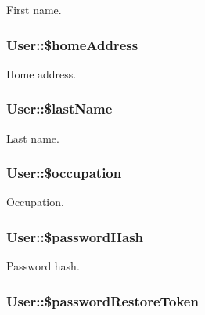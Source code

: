 \label{classUser_ab4216ecb16d420f69cb32659a6744846}
First name. \hypertarget{classUser_a1588ee38de5c013009e557c4806178cf}{
\subsubsection[{\$homeAddress}]{\setlength{\rightskip}{0pt plus 5cm}User::\$homeAddress}}
\label{classUser_a1588ee38de5c013009e557c4806178cf}
Home address. \hypertarget{classUser_a4f49336b16dc2612dae2069a078f4f14}{
\subsubsection[{\$lastName}]{\setlength{\rightskip}{0pt plus 5cm}User::\$lastName}}
\label{classUser_a4f49336b16dc2612dae2069a078f4f14}
Last name. \hypertarget{classUser_a434aa8daa7cab054eb51aa15546156b1}{
\subsubsection[{\$occupation}]{\setlength{\rightskip}{0pt plus 5cm}User::\$occupation}}
\label{classUser_a434aa8daa7cab054eb51aa15546156b1}
Occupation. \hypertarget{classUser_a329d5d877d90e34b99c969fd573c8f50}{
\subsubsection[{\$passwordHash}]{\setlength{\rightskip}{0pt plus 5cm}User::\$passwordHash}}
\label{classUser_a329d5d877d90e34b99c969fd573c8f50}
Password hash. \hypertarget{classUser_a499d31c84301d5ff26c38906c74fab82}{
\subsubsection[{\$passwordRestoreToken}]{\setlength{\rightskip}{0pt plus 5cm}User::\$passwordRestoreToken}}
